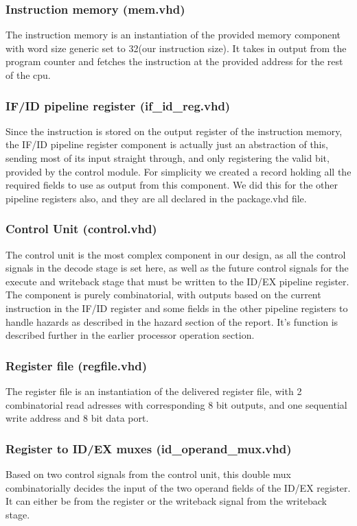 \documentclass[11pt]{report}
\begin{document}
\subsubsection*{Instruction memory (mem.vhd)}
The instruction memory is an instantiation of the provided memory component
with word size generic set to 32(our instruction size). It takes in
output from the program counter and fetches the instruction at the provided
address for the rest of the cpu.
\subsubsection*{IF/ID pipeline register (if\_id\_reg.vhd)}
Since the instruction is stored on the output register of the instruction memory,
the IF/ID pipeline register component is actually just an abstraction of this, sending 
most of its input straight through, and only registering the valid bit, provided by
the control module. For simplicity we created a record holding all the required fields
to use as output from this component. We did this for the other pipeline registers
also, and they are all declared in the package.vhd file.

\subsubsection*{Control Unit (control.vhd)}

The control unit is the most complex component in our design, as all the control
signals in the decode stage is set here, as well as the future control signals for
the execute and writeback stage that must be written to the ID/EX pipeline register.
The component is purely combinatorial, with outputs based on the current instruction in the
IF/ID register and some fields in the other pipeline registers to handle hazards as
described in the hazard section of the report. It's function is described further in the 
earlier processor operation section.

\subsubsection*{Register file (regfile.vhd)}
The register file is an instantiation of the delivered register file, with 
2 combinatorial read adresses with corresponding 8 bit outputs, and one sequential
write address and 8 bit data port.

\subsubsection*{Register to ID/EX muxes (id\_operand\_mux.vhd)}
Based on two control signals from the control unit, this double mux combinatorially
decides the input of the two operand fields of the ID/EX register. It can 
either be from the register or the writeback signal from the writeback stage.
\end{document}
